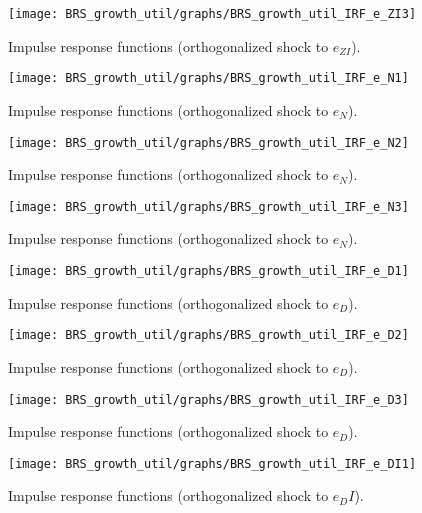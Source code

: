 \begin{figure}[H]
\centering 
\texttt{[image: BRS\_growth\_util/graphs/BRS\_growth\_util\_IRF\_e\_ZI3]}
\caption{Impulse response functions (orthogonalized shock to ${e_{ZI}}$).}\label{Fig:IRF:e_ZI:3}
\end{figure}
 
\begin{figure}[H]
\centering 
\texttt{[image: BRS\_growth\_util/graphs/BRS\_growth\_util\_IRF\_e\_N1]}
\caption{Impulse response functions (orthogonalized shock to ${e_N}$).}\label{Fig:IRF:e_N:1}
\end{figure}
 
\begin{figure}[H]
\centering 
\texttt{[image: BRS\_growth\_util/graphs/BRS\_growth\_util\_IRF\_e\_N2]}
\caption{Impulse response functions (orthogonalized shock to ${e_N}$).}\label{Fig:IRF:e_N:2}
\end{figure}
 
\begin{figure}[H]
\centering 
\texttt{[image: BRS\_growth\_util/graphs/BRS\_growth\_util\_IRF\_e\_N3]}
\caption{Impulse response functions (orthogonalized shock to ${e_N}$).}\label{Fig:IRF:e_N:3}
\end{figure}
 
\begin{figure}[H]
\centering 
\texttt{[image: BRS\_growth\_util/graphs/BRS\_growth\_util\_IRF\_e\_D1]}
\caption{Impulse response functions (orthogonalized shock to ${e_D}$).}\label{Fig:IRF:e_D:1}
\end{figure}
 
\begin{figure}[H]
\centering 
\texttt{[image: BRS\_growth\_util/graphs/BRS\_growth\_util\_IRF\_e\_D2]}
\caption{Impulse response functions (orthogonalized shock to ${e_D}$).}\label{Fig:IRF:e_D:2}
\end{figure}
 
\begin{figure}[H]
\centering 
\texttt{[image: BRS\_growth\_util/graphs/BRS\_growth\_util\_IRF\_e\_D3]}
\caption{Impulse response functions (orthogonalized shock to ${e_D}$).}\label{Fig:IRF:e_D:3}
\end{figure}
 
\begin{figure}[H]
\centering 
\texttt{[image: BRS\_growth\_util/graphs/BRS\_growth\_util\_IRF\_e\_DI1]}
\caption{Impulse response functions (orthogonalized shock to ${e_DI}$).}\label{Fig:IRF:e_DI:1}
\end{figure}
 
